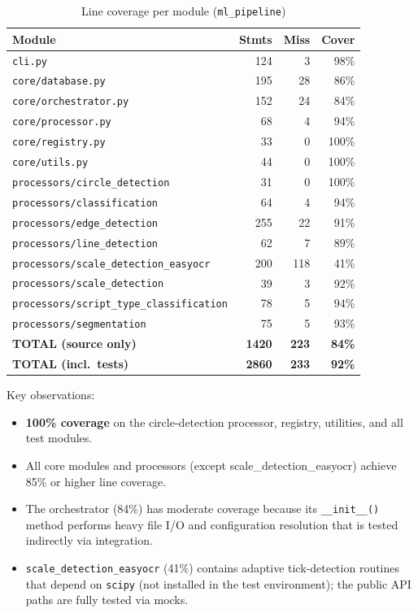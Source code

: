 \documentclass[12pt, titlepage]{article}
\begin{document}
\begin{table}[h]
\centering
\scriptsize
\begin{tabular}{l r r r}
\hline
\textbf{Module} & \textbf{Stmts} & \textbf{Miss} & \textbf{Cover} \\
\hline
\texttt{cli.py}                                 & 124 &   3 & 98\% \\
\texttt{core/database.py}                       & 195 &  28 & 86\% \\
\texttt{core/orchestrator.py}                   & 152 &  24 & 84\% \\
\texttt{core/processor.py}                      &  68 &   4 & 94\% \\
\texttt{core/registry.py}                       &  33 &   0 & 100\% \\
\texttt{core/utils.py}                          &  44 &   0 & 100\% \\
\texttt{processors/circle\_detection}           &  31 &   0 & 100\% \\
\texttt{processors/classification}              &  64 &   4 & 94\% \\
\texttt{processors/edge\_detection}             & 255 &  22 & 91\% \\
\texttt{processors/line\_detection}             &  62 &   7 & 89\% \\
\texttt{processors/scale\_detection\_easyocr}   & 200 & 118 & 41\% \\
\texttt{processors/scale\_detection}            &  39 &   3 & 92\% \\
\texttt{processors/script\_type\_classification}&  78 &   5 & 94\% \\
\texttt{processors/segmentation}                &  75 &   5 & 93\% \\
\hline
\textbf{TOTAL (source only)}                    & \textbf{1420} & \textbf{223} & \textbf{84\%} \\
\textbf{TOTAL (incl.\ tests)}                   & \textbf{2860} & \textbf{233} & \textbf{92\%} \\
\hline
\end{tabular}
\caption{Line coverage per module (\texttt{ml\_pipeline})}
\end{table}

Key observations:
\begin{itemize}
  \item \textbf{100\% coverage} on the circle-detection processor, registry, utilities,
        and all test modules.
  \item All core modules and processors (except scale\_detection\_easyocr) achieve
        85\% or higher line coverage.
  \item The orchestrator (84\%) has moderate coverage because its \texttt{\_\_init\_\_()}
        method performs heavy file I/O and configuration resolution that is tested
        indirectly via integration.
  \item \texttt{scale\_detection\_easyocr} (41\%) contains adaptive tick-detection
        routines that depend on \texttt{scipy} (not installed in the test
        environment); the public API paths are fully tested via mocks.
\end{itemize}
\end{document}

